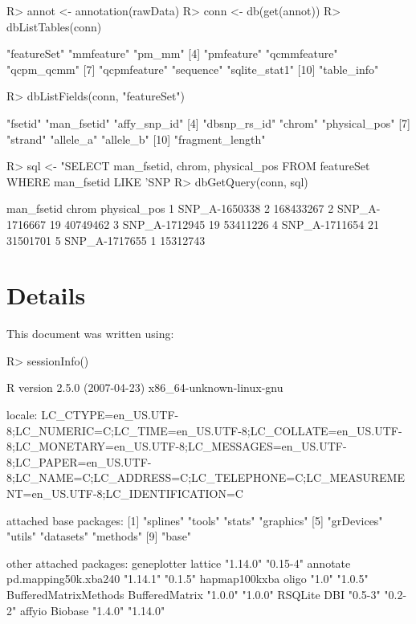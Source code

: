\documentclass{article}
\begin{document}
\begin{Schunk}
\begin{Sinput}
R> annot <- annotation(rawData)
R> conn <- db(get(annot))
R> dbListTables(conn)
\end{Sinput}
\begin{Soutput}
 [1] "featureSet"   "mmfeature"    "pm_mm"       
 [4] "pmfeature"    "qcmmfeature"  "qcpm_qcmm"   
 [7] "qcpmfeature"  "sequence"     "sqlite_stat1"
[10] "table_info"  
\end{Soutput}
\begin{Sinput}
R> dbListFields(conn, "featureSet")
\end{Sinput}
\begin{Soutput}
 [1] "fsetid"          "man_fsetid"      "affy_snp_id"    
 [4] "dbsnp_rs_id"     "chrom"           "physical_pos"   
 [7] "strand"          "allele_a"        "allele_b"       
[10] "fragment_length"
\end{Soutput}
\begin{Sinput}
R> sql <- "SELECT man_fsetid, chrom, physical_pos FROM featureSet WHERE man_fsetid LIKE 'SNP%
R> dbGetQuery(conn, sql)
\end{Sinput}
\begin{Soutput}
     man_fsetid chrom physical_pos
1 SNP_A-1650338     2    168433267
2 SNP_A-1716667    19     40749462
3 SNP_A-1712945    19     53411226
4 SNP_A-1711654    21     31501701
5 SNP_A-1717655     1     15312743
\end{Soutput}
\end{Schunk}
 
\section{Details}

This document was written using:

\begin{Schunk}
\begin{Sinput}
R> sessionInfo()
\end{Sinput}
\begin{Soutput}
R version 2.5.0 (2007-04-23) 
x86_64-unknown-linux-gnu 

locale:
LC_CTYPE=en_US.UTF-8;LC_NUMERIC=C;LC_TIME=en_US.UTF-8;LC_COLLATE=en_US.UTF-8;LC_MONETARY=en_US.UTF-8;LC_MESSAGES=en_US.UTF-8;LC_PAPER=en_US.UTF-8;LC_NAME=C;LC_ADDRESS=C;LC_TELEPHONE=C;LC_MEASUREMENT=en_US.UTF-8;LC_IDENTIFICATION=C

attached base packages:
[1] "splines"   "tools"     "stats"     "graphics" 
[5] "grDevices" "utils"     "datasets"  "methods"  
[9] "base"     

other attached packages:
          geneplotter               lattice 
             "1.14.0"              "0.15-4" 
             annotate  pd.mapping50k.xba240 
             "1.14.1"               "0.1.5" 
        hapmap100kxba                 oligo 
                "1.0"               "1.0.5" 
BufferedMatrixMethods        BufferedMatrix 
              "1.0.0"               "1.0.0" 
              RSQLite                   DBI 
              "0.5-3"               "0.2-2" 
               affyio               Biobase 
              "1.4.0"              "1.14.0" 
\end{Soutput}
\end{Schunk}
\end{document}

